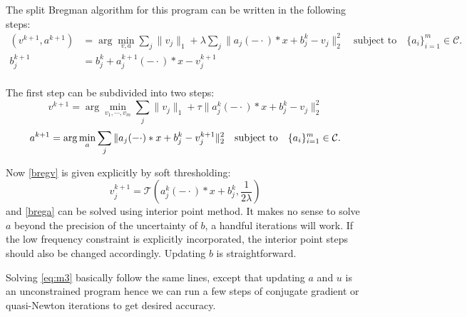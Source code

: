 \documentclass[a4paper]{article}
\begin{document}
The split Bregman algorithm for this program can be written in the following steps:
\begin{equation}
\label{breg:all}
\begin{aligned}
	(v^{k+1},a^{k+1}) &=\arg\min_{v,a} \sum_j \|v_j\|_1 + \lambda\sum_j\|a_j(-\cdot)*x+b_j^k-v_j\|_2^2 \quad\textrm{subject to} \quad \{a_i\}_{i=1}^m \in \mathcal{C}.\\
	b_j^{k+1} &= b_j^k + a_j^{k+1}(-\cdot)*x - v_j^{k+1} \\
\end{aligned}
\end{equation}

The first step can be subdivided into two steps:
\begin{equation}
\label{bregv}
		v^{k+1}  = \arg\min_{v_1,\cdots,v_m}  \sum_j \|v_j\|_1 + \tau \|a^k_j(-\cdot)*x +b^k_j -v_j\|_2^2
\end{equation}
\begin{equation}
\label{brega}
a^{k+1} =\arg\min_a \sum_j \|a_j(-\cdot)*x+b^{k}_j-v^{k+1}_j\|_2^2   \quad\textrm{subject to} \quad \{a_i\}_{i=1}^m \in \mathcal{C}.\\
\end{equation}

Now \eqref{bregv} is given explicitly by soft thresholding:
\begin{equation}
	v^{k+1}_j = \mathcal{T}(a^k_j(-\cdot)*x+b^k_j,\frac{1}{2\lambda})
\end{equation}
and \eqref{brega} can be solved using interior point method. It makes no sense to solve $a$ beyond the precision of the uncertainty of $b$, a handful iterations will work. If the low frequency constraint is explicitly incorporated, the interior point steps should also be changed accordingly. Updating $b$ is straightforward.

Solving \eqref{eq:m3} basically follow the same lines, except that updating $a$ and $u$ is an unconstrained program hence we can run a few steps of conjugate gradient or quasi-Newton iterations to get desired accuracy.












\end{document}
